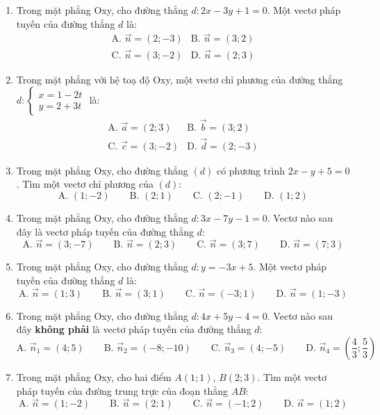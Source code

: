 \documentclass[12pt]{article}
\begin{document}
\begin{enumerate}[label=\textbf{Câu \arabic*:}]
\item Trong mặt phẳng Oxy, cho đường thẳng $d: 2x - 3y + 1 = 0$. Một vectơ pháp tuyến của đường thẳng $d$ là:
\[
\begin{array}{ll}
\text{A. } \vec{n} = (2; -3) & \text{B. } \vec{n} = (3; 2) \\
\text{C. } \vec{n} = (3; -2) & \text{D. } \vec{n} = (2; 3)
\end{array}
\]

\item Trong mặt phẳng với hệ toạ độ Oxy, một vectơ chỉ phương của đường thẳng $d: \begin{cases} x = 1 - 2t \\ y = 2 + 3t \end{cases}$ là:
\[
\begin{array}{ll}
\text{A. } \vec{a} = (2; 3) & \text{B. } \vec{b} = (3; 2) \\
\text{C. } \vec{c} = (3; -2) & \text{D. } \vec{d} = (2; -3)
\end{array}
\]

\item Trong mặt phẳng Oxy, cho đường thẳng $(d)$ có phương trình $2x - y + 5 = 0$. Tìm một vectơ chỉ phương của $(d)$:
\[
\text{A. } (1; -2) \qquad \text{B. } (2; 1) \qquad \text{C. } (2; -1) \qquad \text{D. } (1; 2)
\]

\item Trong mặt phẳng Oxy, cho đường thẳng $d: 3x - 7y - 1 = 0$. Vectơ nào sau đây là vectơ pháp tuyến của đường thẳng $d$:
\[
\text{A. } \vec{n} = (3; -7) \qquad \text{B. } \vec{n} = (2; 3) \qquad \text{C. } \vec{n} = (3; 7) \qquad \text{D. } \vec{n} = (7; 3)
\]

\item Trong mặt phẳng Oxy, cho đường thẳng $d: y = -3x + 5$. Một vectơ pháp tuyến của đường thẳng $d$ là:
\[
\text{A. } \vec{n} = (1; 3) \qquad \text{B. } \vec{n} = (3; 1) \qquad \text{C. } \vec{n} = (-3; 1) \qquad \text{D. } \vec{n} = (1; -3)
\]

\item Trong mặt phẳng Oxy, cho đường thẳng $d: 4x + 5y - 4 = 0$. Vectơ nào sau đây \textbf{không phải} là vectơ pháp tuyến của đường thẳng $d$:
\[
\text{A. } \vec{n}_1 = (4; 5) \qquad \text{B. } \vec{n}_2 = (-8; -10) \qquad \text{C. } \vec{n}_3 = (4; -5) \qquad \text{D. } \vec{n}_4 = \left(\frac{4}{3}; \frac{5}{3}\right)
\]

\item Trong mặt phẳng Oxy, cho hai điểm $A(1;1)$, $B(2;3)$. Tìm một vectơ pháp tuyến của đường trung trực của đoạn thẳng $AB$:
\[
\text{A. } \vec{n} = (1; -2) \qquad \text{B. } \vec{n} = (2; 1) \qquad \text{C. } \vec{n} = (-1; 2) \qquad \text{D. } \vec{n} = (1; 2)
\]


\end{enumerate}
\end{document}
